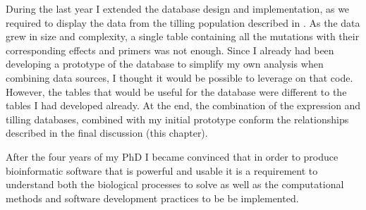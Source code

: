During the last year I extended the database design and implementation, as we required to display the data from the tilling population described in \citet{Krasileva2016}. 
As the data grew in size and complexity, a single table containing all the mutations with their corresponding effects and primers was not enough. 
Since I already had been developing a prototype of the database to simplify my own analysis when combining data sources, I thought it would be possible to leverage on that code. 
However, the tables that would be useful for the database were different to the tables I had developed already. 
At the end, the combination of the expression and tilling databases, combined with my initial prototype conform the relationships described in the final discussion (this chapter). 

After the four years of my PhD I became convinced that in order to produce bioinformatic software that is powerful and usable it is a requirement to understand both the biological processes to solve as well as the computational methods and software development practices to be be implemented.

